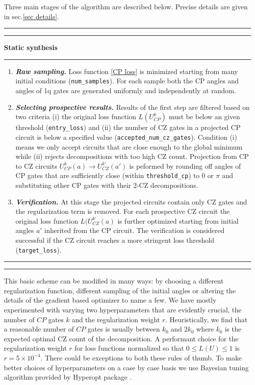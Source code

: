 \documentclass[draft, amsfonts, amssymb, aps, nofootinbib, twocolumn]{revtex4-2}
\newcommand{\CZ}{CZ }
\newcommand{\CP}{CP }
\newcommand{\param}[1]{\texttt{#1}}
\begin{document}
Three main stages of the algorithm are described below. Precise details are given in sec.\ref{sec details}.
\\[6pt]
\hrule
\hrule
\vspace{6pt}
{\large\textbf{\qquad Static synthesis}}
\vspace{6pt}
\hrule
\begin{enumerate}
\item \textit{\textbf{ Raw sampling.}} Loss function \eqref{CP loss} is minimized starting from many initial conditions (\param{num\_samples}). For each sample both the \CP angles and angles of 1q gates are generated uniformly and independently at random. 
\item \textit{\textbf{Selecting prospective results.}} Results of the first step are filtered based on two criteria (i) the original loss function $L(U^k_{CP})$ must be below an  given threshold (\param{entry\_loss}) and (ii) the number of \CZ gates in a projected \CP circuit is below a specified value (\param{accepted\_num\_cz\_gates}). Condition (i) means we only accept circuits that are close enough to the global minimum while (ii) rejects decompositions with too high \CZ count. Projection from \CP to \CZ circuits $U_{CP}^k(a)\to U_{CZ}^{k'}(a')$ is peformed by rounding off angles of \CP gates that are sufficiently close (within \param{threshold\_cp}) to $0$ or $\pi$ and substituting other \CP gates with their 2-\CZ decompositions. 
\item \textit{\textbf{Verification.}} At this stage the projected circuits contain only \CZ gates and the regularization term is removed. For each prospective \CZ circuit the original loss function $L(U_{CZ}^{k'}(a)$ is further optimized starting from initial angles $a'$ inherited from the \CP circuit. The verification is considered successful if the \CZ circuit reaches a more stringent loss threshold (\param{target\_loss}). 
\end{enumerate}
\hrule
\hrule
\vspace{20pt}

This basic scheme can be modified in many ways: by choosing a different regularization function, different sampling of the initial angles or altering the details of the gradient based optimizer to name a few. We have mostly experimented with varying two hyperparameters that are evidently crucial, the number of $CP$ gates $k$ and the regularization weight $r$. Heuristically, we find that a reasonable number of $CP$ gates is usually between $k_0$ and $2k_0$ where $k_0$ is the expected optimal \CZ count of the decomposition. A performant choice for the regularization weight $r$ for loss functions normalized so that $0\le L(U) \le 1$ is $r=5\times 10^{-4}$. There could be exceptions to both these rules of thumb. To make better choices of hyperparameters on a case by case basis we use Bayesian tuning algorithm provided by Hyperopt package \cite{hyperopt}.
\end{document}
